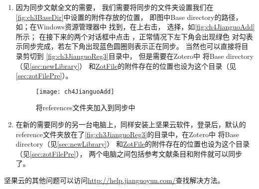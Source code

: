 \documentclass[cn,11pt,chinese]{elegantbook}
\begin{document}
\begin{enumerate}
\begin{figure}
				\end{figure}
			\item  因为同步文献全文的需要，
				我们需要将同步的文件夹设置我们在\autoref{fig:ch3BaseDir}中设置的附件存放的位置，
				即图中Base directory的路径，
				如；在Windows资源管理器中
				找到\winpath{references}，在上右击，
				选择，如\autoref{fig:ch4JianguoAdd}所示；
				在接下来的两个对话框中点击
				，正常情况下左下角会出现绿色
				对勾表示同步完成，若左下角出现蓝色圆圈则表示正在同步。
				当然也可以直接将目录剪切到
				\autoref{fig:ch3JianguoReg3}目录中，
				但是需要在Zotero中
			将Base directory（见\cref{sec:newLibrary}）
			和\href{http://zotfile.com/}{ZotFile}的附件存在的位置也设为这个目录（见\cref{sec:zotFilePre}）。
					\begin{figure}[htbp]
						\centering
						\texttt{[image: ch4JianguoAdd]}
						\caption{将references文件夹加入到同步中}
						\label{fig:ch4JianguoAdd}
					\end{figure}
			\item 在新的需要同步的另一台电脑上，同样安装上坚果云软件，登录后，默认的
			reference文件夹放在了\autoref{fig:ch3JianguoReg3}的目录中，在Zotero中
			将Base directory（见\cref{sec:newLibrary}）
			和\href{http://zotfile.com/}{ZotFile}的附件存在的位置也设为这个目录（见\cref{sec:zotFilePre}）， 
			两个电脑之间包括参考文献条目和附件就可以同步了。
	
		\end{enumerate}
		

		坚果云的其他问题可以访问\url{http://help.jianguoyun.com/}查找解决方法。
		
\end{document}
